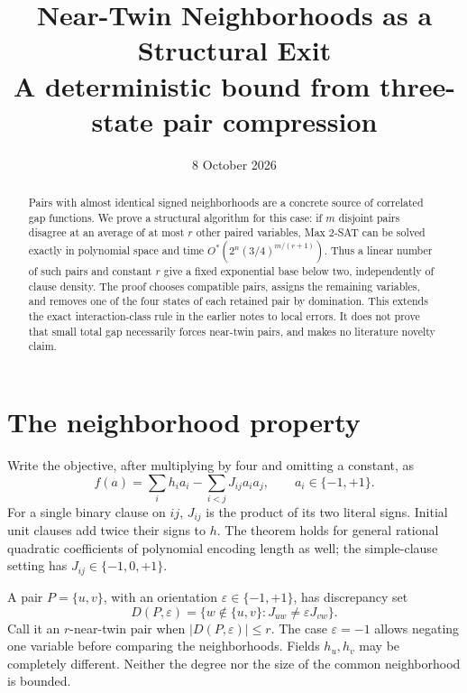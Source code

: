 \documentclass[11pt,a4paper]{article}
\title{Near-Twin Neighborhoods as a Structural Exit\\
\large A deterministic bound from three-state pair compression}
\author{}
\date{8 October 2026}
\newcommand{\Ostar}{O^{*}}
\begin{document}
\maketitle

\begin{abstract}
Pairs with almost identical signed neighborhoods are a concrete source of
correlated gap functions. We prove a structural algorithm for this case:
if $m$ disjoint pairs disagree at an average of at most $r$ other paired
variables, Max
2-SAT can be solved exactly in polynomial space and time
$\Ostar(2^n(3/4)^{m/(r+1)})$. Thus a linear number of such pairs and
constant $r$ give a fixed exponential base below two, independently of
clause density. The proof chooses compatible pairs, assigns the remaining
variables, and removes one of the four states of each retained pair by
domination. This extends the exact interaction-class rule in the earlier
notes to local errors. It does not prove that small total gap necessarily
forces near-twin pairs, and makes no literature novelty claim.
\end{abstract}

\section{The neighborhood property}

Write the objective, after multiplying by four and omitting a constant,
as
\begin{equation}
 f(a)=\sum_i h_i a_i-\sum_{i<j}J_{ij}a_i a_j,
 \qquad a_i\in\{-1,+1\}.                           \label{eq:score}
\end{equation}
For a single binary clause on $ij$, $J_{ij}$ is the product of its two
literal signs. Initial unit clauses add twice their signs to $h$.
The theorem holds for general rational quadratic coefficients of
polynomial encoding length as well; the simple-clause setting has
$J_{ij}\in\{-1,0,+1\}$.

A pair $P=\{u,v\}$, with an orientation $\varepsilon\in\{-1,+1\}$,
has discrepancy set
\begin{equation}
 D(P,\varepsilon)=
 \{w\notin\{u,v\}:J_{uw}\ne\varepsilon J_{vw}\}.      \label{eq:D}
\end{equation}
Call it an $r$-near-twin pair when $|D(P,\varepsilon)|\le r$.
The case $\varepsilon=-1$ allows negating one variable before comparing
the neighborhoods. Fields $h_u,h_v$ may be completely different.
Neither the degree nor the size of the common neighborhood is bounded.
\end{document}

